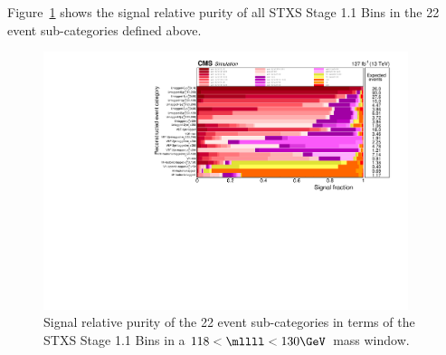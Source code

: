 Figure~\ref{fig:categ-purity-stage11} shows the signal relative purity of all STXS Stage 1.1 Bins in the 22 event sub-categories defined above.
\begin{figure}[!htb]
  \vspace*{0.3cm}
  \begin{center}
    \includegraphics[width=0.95\textwidth]{Figures/stxs/STXS_Purity.pdf}
    \caption{Signal relative purity of the 22 event sub-categories in terms of the STXS Stage 1.1 Bins in a $118<\mllll<130\GeV$ mass window.
      \label{fig:categ-purity-stage11}}
    \end{center}
\end{figure}
